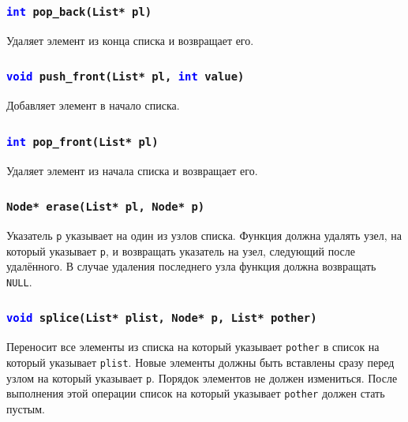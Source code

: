 \documentclass{article}
\begin{document}
\subsubsection{\texttt{\textcolor{blue}{int} pop\_back(List* pl)}}
Удаляет элемент из конца списка и возвращает его.

\subsubsection{\texttt{\textcolor{blue}{void} push\_front(List* pl, \textcolor{blue}{int} value)}}
Добавляет элемент в начало списка.

\subsubsection{\texttt{\textcolor{blue}{int} pop\_front(List* pl)}}
Удаляет элемент из начала списка и возвращает его.

\subsubsection{\texttt{Node* erase(List* pl, Node* p)}}
Указатель \texttt{p} указывает на один из узлов списка.
Функция должна удалять узел, на который указывает \texttt{p}, и возвращать указатель на узел, следующий после удалённого. В случае удаления последнего узла функция должна возвращать \texttt{NULL}.


\subsubsection{\texttt{\textcolor{blue}{void} splice(List* plist, Node* p, List* pother)}}
Переносит все элементы из списка на который указывает \texttt{pother} в список на который указывает \texttt{plist}. Новые элементы должны быть вставлены сразу перед узлом на который указывает \texttt{p}. Порядок элементов не должен измениться. После выполнения этой операции список на который указывает \texttt{pother} должен стать пустым.
\end{document}
